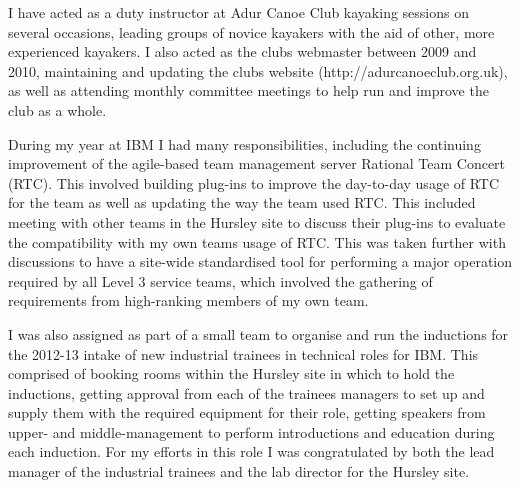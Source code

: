 \documentclass[10pt,stdletter,dateno,sigleft]{newlfm} %
\begin{document}
\begin{newlfm}
I have acted as a duty instructor at Adur Canoe Club kayaking sessions on several occasions, leading groups of novice kayakers with the aid of other, more experienced kayakers. I also acted as the clubs webmaster between 2009 and 2010, maintaining and updating the clubs website (http://adurcanoeclub.org.uk), as well as attending monthly committee meetings to help run and improve the club as a whole.

During my year at IBM I had many responsibilities, including the continuing improvement of the agile-based team management server Rational Team Concert (RTC). This involved building plug-ins to improve the day-to-day usage of RTC for the team as well as updating the way the team used RTC. This included meeting with other teams in the Hursley site to discuss their plug-ins to evaluate the compatibility with my own teams usage of RTC. This was taken further with discussions to have a site-wide standardised tool for performing a major operation required by all Level 3 service teams, which involved the gathering of requirements from high-ranking members of my own team.

I was also assigned as part of a small team to organise and run the inductions for the 2012-13 intake of new industrial trainees in technical roles for IBM. This comprised of booking rooms within the Hursley site in which to hold the inductions, getting approval from each of the trainees managers to set up and supply them with the required equipment for their role, getting speakers from upper- and middle-management to perform introductions and education during each induction. For my efforts in this role I was congratulated by both the lead manager of the industrial trainees and the lab director for the Hursley site.





 

\end{newlfm}
\end{document}
